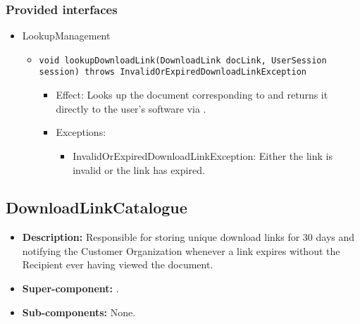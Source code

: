 \subsubsection*{Provided interfaces}
\begin{itemize}
    \item LookupManagement
    \begin{itemize}
        \item \texttt{void lookupDownloadLink(DownloadLink docLink, UserSession session) throws InvalidOrExpiredDownloadLinkException}
        \begin{itemize}
            \item Effect: Looks up the document corresponding to  and returns it directly to the user's software via .
            \item Exceptions:
            \begin{itemize}
                \item InvalidOrExpiredDownloadLinkException: Either the link is invalid or the link has expired.
            \end{itemize}
        \end{itemize}
    \end{itemize}
\end{itemize}

\subsection{DownloadLinkCatalogue}
\begin{itemize}
    \item \textbf{Description:} Responsible for storing unique download links for 30 days and notifying the Customer Organization whenever a link expires without the Recipient ever having viewed the document.
    \item \textbf{Super-component:} .
    \item \textbf{Sub-components:} None.
\end{itemize}

